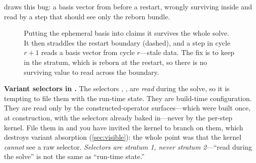  draws this bug: a basis vector from before a restart, wrongly
surviving inside  and read by a step that should see only the
reborn bundle.

\begin{figure}[t]
\centering
{}
\caption[The ephemeral-in- bug]{Putting the ephemeral basis
 into  claims it survives the whole solve. It then
straddles the restart boundary (dashed), and a step in cycle $r{+}1$ reads a
basis vector from cycle $r$---stale data. The fix is to keep  in the
 stratum, which is reborn at the restart, so there is no surviving
value to read across the boundary.}
\label{fig:bug}
\end{figure}

\begin{pitfall}
\textbf{Variant selectors in .} The selectors ,
,  are \emph{read} during the solve, so it is
tempting to file them with the run-time state. They are build-time
configuration. They are read only by the constructed-operator surfaces---which
were built once, at construction, with the selectors already baked in---never by
the per-step kernel. File them in  and you have invited the kernel
to branch on them, which destroys variant absorption (\cref{sec:visible}): the
whole point was that the kernel \emph{cannot} see a raw selector. \emph{Selectors
are stratum 1, never stratum 2}---``read during the solve'' is not the same as
``run-time state.''
\end{pitfall}

